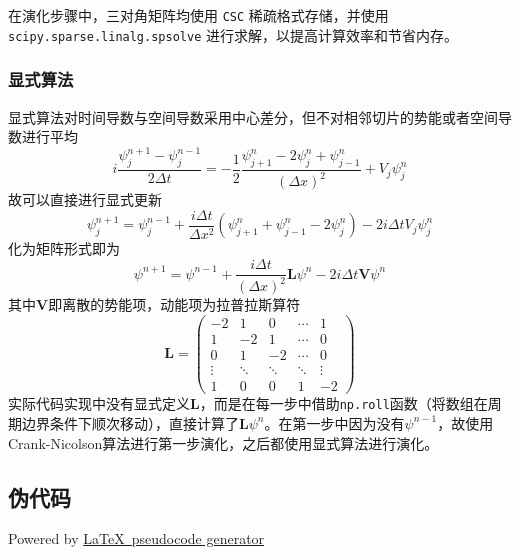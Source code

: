 在演化步骤中，三对角矩阵均使用 \texttt{CSC} 稀疏格式存储，并使用 \texttt{scipy.sparse.linalg.spsolve} 进行求解，以提高计算效率和节省内存。
\subsubsection{显式算法}
显式算法对时间导数与空间导数采用中心差分，但不对相邻切片的势能或者空间导数进行平均
\[
    i \frac{\psi_j^{n+1} - \psi_j^{n-1}}{2\Delta t} = -\frac{1}{2} \frac{\psi_{j+1}^n - 2\psi_j^n + \psi_{j-1}^n}{(\Delta x)^2} + V_j \psi_j^n
\]
故可以直接进行显式更新
\[
    \psi_j^{n+1} = \psi_j^{n-1} + \frac{i \Delta t}{\Delta x^2} \left( \psi_{j+1}^n + \psi_{j-1}^n - 2\psi_j^n \right) - 2i \Delta t V_j \psi_j^n
\]
化为矩阵形式即为
\[
    \psi^{n+1} = \psi^{n-1} + \frac{i \Delta t}{(\Delta x)^2} \mathbf{L} \psi^n - 2i \Delta t \mathbf{V} \psi^n
\]
其中$\mathbf{V}$即离散的势能项，动能项为拉普拉斯算符
\[
    \mathbf{L} =
    \begin{pmatrix}
        -2     & 1      & 0      & \cdots & 1      \\
        1      & -2     & 1      & \cdots & 0      \\
        0      & 1      & -2     & \cdots & 0      \\
        \vdots & \ddots & \ddots & \ddots & \vdots \\
        1      & 0      & 0      & 1      & -2
    \end{pmatrix}
\]
实际代码实现中没有显式定义$\mathbf{L}$，而是在每一步中借助\texttt{np.roll}函数（将数组在周期边界条件下顺次移动），直接计算了$\mathbf{L} \psi^n$。在第一步中因为没有$\psi^{n-1}$，故使用Crank-Nicolson算法进行第一步演化，之后都使用显式算法进行演化。
\subsection{伪代码}
Powered by \href{https://chatgpt.com/g/g-xJJAA2awf-latex-pseudocode-generator}{\LaTeX \ pseudocode generator}

